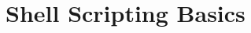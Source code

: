 \documentclass[10pt,t]{beamer}
\newcommand*\enter{\tikz[baseline=-0.5ex] \draw[<-] (0,0) -| (0.5,0.1);}
\begin{document}

\section{Shell Scripting Basics}
\end{document}
